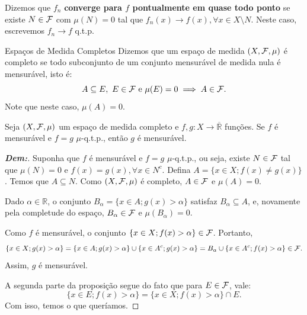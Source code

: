 Dizemos que $f_n$ \textbf{converge para $f$ pontualmente em quase todo ponto} se existe $N \in \mathcal{F}$ com $\mu(N) = 0$ tal que $f_n(x) \to f(x), \forall x \in X \setminus N$. Neste caso, escrevemos $f_n \to f$ q.t.p.
\vspace{5mm}
\begin{definition*}{Espaços de Medida Completos}
Dizemos que um espaço de medida $(X, \mathcal{F}, \mu)$ é completo se todo subconjunto de um conjunto mensurável de medida nula é mensurável, isto é:
$$ A \subseteq E, \ E \in \mathcal{F} \ \text{e} \ \mu(E) = 0 \implies A \in \mathcal{F}. $$
Note que neste caso, $\mu(A) = 0$.
\end{definition*}

\begin{prop*}{}
Seja $(X, \mathcal{F}, \mu)$ um espaço de medida completo e $f, g: X \to \overline{\mathbb{R}}$ funções. Se $f$ é mensurável e $f=g$ $\mu$-q.t.p., então $g$ é mensurável.
\end{prop*}

\begin{proof}[\textbf{Dem:}]
Suponha que $f$ é mensurável e $f=g$ $\mu$-q.t.p., ou seja, existe $N \in \mathcal{F}$ tal que $\mu(N) = 0$ e $f(x) = g(x), \forall x \in N^c$. 
Defina $A = \{x \in X; f(x) \neq g(x)\}$. Temos que $A \subseteq N$. Como $(X, \mathcal{F}, \mu)$ é completo, $A \in \mathcal{F}$ e $\mu(A) = 0$.

Dado $\alpha \in \mathbb{R}$, o conjunto $B_\alpha = \{x \in A; g(x) > \alpha\}$ satisfaz $B_\alpha \subseteq A$, e, novamente pela completude do espaço, $B_\alpha \in \mathcal{F}$ e $\mu(B_\alpha) = 0$.

Como $f$ é mensurável, o conjunto $\{x \in X; f(x) > \alpha\} \in \mathcal{F}$. Portanto,
$$ \{x \in X; g(x) > \alpha\} = \{x \in A; g(x) > \alpha\} \cup \{x \in A^c; g(x) > \alpha\} = B_\alpha \cup \{x \in A^c; f(x) > \alpha\} \in \mathcal{F}. $$
Assim, $g$ é mensurável. 

A segunda parte da proposição segue do fato que para $E \in \mathcal{F}$, vale:
$$ \{x \in E; f(x) > \alpha\} = \{x \in X; f(x) > \alpha\} \cap E. $$
Com isso, temos o que queríamos.
\end{proof}
